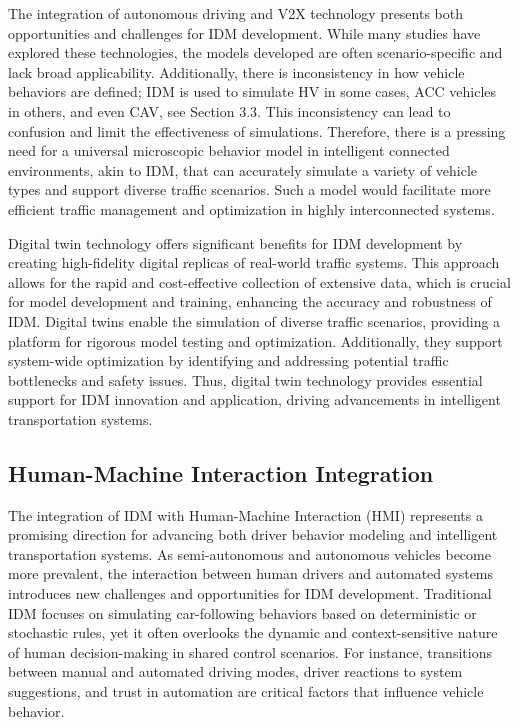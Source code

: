 \documentclass[a4paper,fleqn]{cas-sc}
\begin{document}
The integration of autonomous driving and V2X technology presents both opportunities and challenges for IDM development. While many studies have explored these technologies, the models developed are often scenario-specific and lack broad applicability. Additionally, there is inconsistency in how vehicle behaviors are defined; IDM is used to simulate HV in some cases, ACC vehicles in others, and even CAV, see Section 3.3. This inconsistency can lead to confusion and limit the effectiveness of simulations. Therefore, there is a pressing need for a universal microscopic behavior model in intelligent connected environments, akin to IDM, that can accurately simulate a variety of vehicle types and support diverse traffic scenarios. Such a model would facilitate more efficient traffic management and optimization in highly interconnected systems.

Digital twin technology offers significant benefits for IDM development by creating high-fidelity digital replicas of real-world traffic systems. This approach allows for the rapid and cost-effective collection of extensive data, which is crucial for model development and training, enhancing the accuracy and robustness of IDM. Digital twins enable the simulation of diverse traffic scenarios, providing a platform for rigorous model testing and optimization. Additionally, they support system-wide optimization by identifying and addressing potential traffic bottlenecks and safety issues. Thus, digital twin technology provides essential support for IDM innovation and application, driving advancements in intelligent transportation systems.

\subsection{Human-Machine Interaction Integration}

The integration of IDM with Human-Machine Interaction (HMI) represents a promising direction for advancing both driver behavior modeling and intelligent transportation systems. As semi-autonomous and autonomous vehicles become more prevalent, the interaction between human drivers and automated systems introduces new challenges and opportunities for IDM development. Traditional IDM focuses on simulating car-following behaviors based on deterministic or stochastic rules, yet it often overlooks the dynamic and context-sensitive nature of human decision-making in shared control scenarios. For instance, transitions between manual and automated driving modes, driver reactions to system suggestions, and trust in automation are critical factors that influence vehicle behavior.
\end{document}
